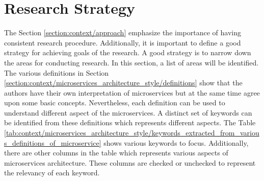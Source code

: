 \section{Research Strategy}\label{section:context/research_strategy}
The Section \ref{section:context/approach} emphasize the importance of having consistent research procedure. Additionally, it is important to define a good strategy for achieving goals of the research. A good strategy is to narrow down the areas for conducting research. In this section, a list of areas will be identified.\\
The various definitions in Section \ref{section:context/microservices_architecture_style/definitions} show that the authors have their own interpretation of microservices but at the same time agree upon some basic concepts. Nevertheless, each definition can be used to understand different aspect of the microservices. A distinct set of keywords can be identified from these definitions which represents different aspects. The Table \ref{tab:context/microservices_architecture_style/keywords_extracted_from_various_definitions_of_microservice} shows various keywords to focus. Additionally, there are other columns in the table which represents various aspects of microservices architecture. These columns are checked or unchecked to represent the relevancy of each keyword. 

